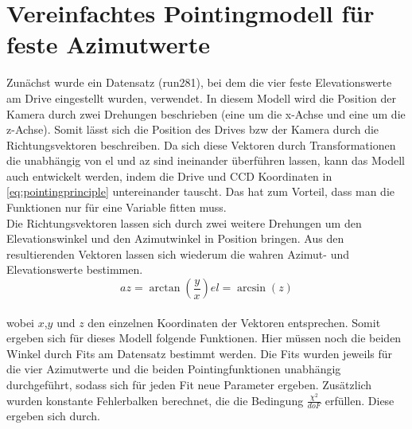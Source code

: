 \section{Vereinfachtes Pointingmodell f\"ur feste Azimutwerte}
Zunächst wurde ein Datensatz (run281), bei dem die vier feste Elevationswerte am Drive eingestellt wurden, verwendet. In diesem Modell wird die Position der Kamera durch zwei Drehungen beschrieben (eine um die x-Achse und eine um die z-Achse). Somit lässt sich die Position des Drives bzw der Kamera durch die Richtungsvektoren beschreiben.
Da sich diese Vektoren durch Transformationen die unabhängig von el und az sind ineinander überführen lassen, kann das Modell auch entwickelt werden, indem die Drive und CCD Koordinaten in \ref{eq:pointingprinciple} untereinander tauscht. Das hat zum Vorteil, dass man die Funktionen nur für eine Variable fitten muss.\\
Die Richtungsvektoren lassen sich durch zwei weitere Drehungen um den Elevationswinkel und den Azimutwinkel in Position bringen. Aus den resultierenden Vektoren lassen sich wiederum die wahren Azimut- und Elevationswerte bestimmen.
\begin{equation}
az=\arctan\left(\frac{y}{x}\right)
el=\arcsin(z)
\end{equation}\\
wobei $x$,$y$ und $z$ den einzelnen Koordinaten der Vektoren entsprechen. Somit ergeben sich für dieses Modell folgende Funktionen.
Hier müssen noch die beiden Winkel durch Fits am Datensatz bestimmt werden. Die Fits wurden jeweils für die vier Azimutwerte und die beiden Pointingfunktionen unabhängig durchgeführt, sodass sich für jeden Fit neue Parameter ergeben. Zusätzlich wurden konstante Fehlerbalken berechnet, die die Bedingung $\frac{\chi^2}{doF}$ erfüllen. Diese ergeben sich durch.